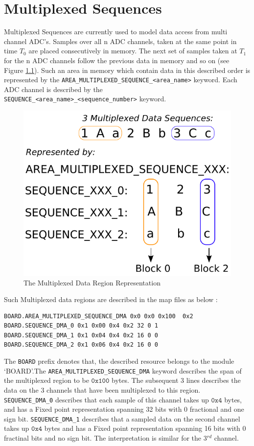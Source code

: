 \chapter{Multiplexed Sequences} \label{appendices::AppendixA}

Multiplexed Sequences are currently used to model data access from multi channel 
ADC's. Samples over all n ADC channels, taken at the same point in time $T_0$ 
are 
placed consecutively in memory. The next set of samples taken at $T_1$ for the n 
ADC channels follow the previous data in memory and so on (see Figure 
\ref{mux_data}). Such 
an area in memory which contain data in this described order is represented by 
the \texttt{AREA\_MULTIPLEXED\_SEQUENCE\_<area\_name>} keyword. Each ADC channel 
is described by the \\
\texttt{SEQUENCE\_<area\_name>\_<sequence\_number>} keyword.


\begin{figure}[htbp] 
    \centering
    \includegraphics[width=.5\textwidth]{images/MuxedSequences.pdf} \caption{The
    Multiplexed Data Region Representation} \label{mux_data} \end{figure}


Such Multiplexed data regions are described in the map files as below :

{\ttfamily  
\begin{lstlisting} 
BOARD.AREA_MULTIPLEXED_SEQUENCE_DMA 0x0 0x0 0x100  0x2
BOARD.SEQUENCE_DMA_0 0x1 0x00 0x4 0x2 32 0 1
BOARD.SEQUENCE_DMA_1 0x1 0x04 0x4 0x2 16 0 0
BOARD.SEQUENCE_DMA_2 0x1 0x06 0x4 0x2 16 0 0
\end{lstlisting} 
}

The \texttt{BOARD} prefix denotes that, the described resource belongs to the 
module `BOARD'.The \texttt{AREA\_MULTIPLEXED\_SEQUENCE\_DMA} keyword describes 
the span of the multiplexed region to be $\mathtt{0x100}$ bytes. The subsequent 
3 lines 
describes the data on the 3 channels that have been multiplexed to this region. 
\texttt{SEQUENCE\_DMA\_0} describes that each sample of this channel takes up 
$\mathtt{0x4}$ bytes, and has a Fixed point representation spanning 32 bits with 
0 fractional and one sign bit. \texttt{SEQUENCE\_DMA\_1} describes that a 
sampled data on the second channel takes up $\mathtt{0x4}$ bytes and has a Fixed 
point representation spanning 16 bits with 0 fractinal bits and no sign bit. The 
interpretation is similar for the 3$^{rd}$ channel.

